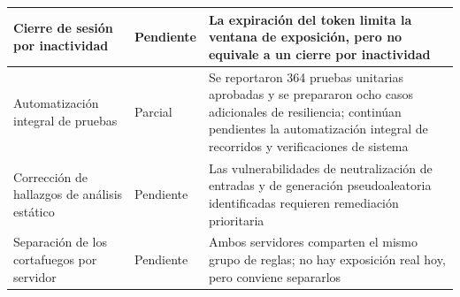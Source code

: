 \begin{longtable}{|p{3.7cm}|p{2.1cm}|p{8.2cm}|}
	Cierre de sesión por inactividad & Pendiente & La expiración del token limita la ventana de
	exposición, pero no equivale a un cierre por inactividad \\ \hline

	Automatización integral de pruebas & Parcial & Se reportaron 364 pruebas unitarias aprobadas y se prepararon ocho casos adicionales de resiliencia; continúan pendientes la automatización integral de recorridos y verificaciones de sistema \\ \hline

	Corrección de hallazgos de análisis estático & Pendiente & Las vulnerabilidades de
	neutralización de entradas y de generación pseudoaleatoria identificadas requieren remediación
	prioritaria \\ \hline

	Separación de los cortafuegos por servidor & Pendiente & Ambos servidores comparten el mismo
	grupo de reglas; no hay exposición real hoy, pero conviene separarlos \\ \hline
\end{longtable}

\normalsize
\setlength{\tabcolsep}{6pt}
\renewcommand{\arraystretch}{1}
